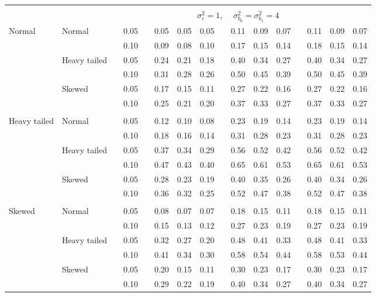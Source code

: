 \documentclass{article} %
\begin{document}
\begin{table}[ht]
\begin{scriptsize}
\begin{center}
\begin{tabular}{ll p{.1cm} c p{.1cm} rrr p{.1cm} rrr p{.1cm} rrr}
&&&&&&&&&&&&&&&\\
& && && \multicolumn{9}{c}{$\sigma_{\varepsilon}^2 = 1$, \ \ $\sigma_{b_0}^2 = \sigma_{b_1}^2 = 4$} \\ \cline{6-16}
Normal       & Normal       && 0.05 &&  0.05 & 0.05 & 0.05 && 0.11 & 0.09 & 0.07 && 0.11 & 0.09 & 0.07 \\ 
             &              && 0.10 &&  0.09 & 0.08 & 0.10 && 0.17 & 0.15 & 0.14 && 0.18 & 0.15 & 0.14 \\ 
             & Heavy tailed && 0.05 &&  0.24 & 0.21 & 0.18 && 0.40 & 0.34 & 0.27 && 0.40 & 0.34 & 0.27 \\ 
             &              && 0.10 &&  0.31 & 0.28 & 0.26 && 0.50 & 0.45 & 0.39 && 0.50 & 0.45 & 0.39 \\ 
             & Skewed       && 0.05 &&  0.17 & 0.15 & 0.11 && 0.27 & 0.22 & 0.16 && 0.27 & 0.22 & 0.16 \\ 
             &              && 0.10 &&  0.25 & 0.21 & 0.20 && 0.37 & 0.33 & 0.27 && 0.37 & 0.33 & 0.27 \\ 
             &&&&&&&&&&&&&&&\\
Heavy tailed & Normal       && 0.05 &&  0.12 & 0.10 & 0.08 && 0.23 & 0.19 & 0.14 && 0.23 & 0.19 & 0.14 \\ 
             &              && 0.10 &&  0.18 & 0.16 & 0.14 && 0.31 & 0.28 & 0.23 && 0.31 & 0.28 & 0.23 \\ 
             & Heavy tailed && 0.05 &&  0.37 & 0.34 & 0.29 && 0.56 & 0.52 & 0.42 && 0.56 & 0.52 & 0.42 \\ 
             &              && 0.10 &&  0.47 & 0.43 & 0.40 && 0.65 & 0.61 & 0.53 && 0.65 & 0.61 & 0.53 \\ 
             & Skewed       && 0.05 &&  0.28 & 0.23 & 0.19 && 0.40 & 0.35 & 0.26 && 0.40 & 0.34 & 0.26 \\ 
             &              && 0.10 &&  0.36 & 0.32 & 0.25 && 0.52 & 0.47 & 0.38 && 0.52 & 0.47 & 0.38 \\ 
             &&&&&&&&&&&&&&&\\
Skewed       & Normal       && 0.05 &&  0.08 & 0.07 & 0.07 && 0.18 & 0.15 & 0.11 && 0.18 & 0.15 & 0.11 \\ 
             &              && 0.10 &&  0.15 & 0.13 & 0.12 && 0.27 & 0.23 & 0.19 && 0.27 & 0.23 & 0.19 \\ 
             & Heavy tailed && 0.05 &&  0.32 & 0.27 & 0.20 && 0.48 & 0.41 & 0.33 && 0.48 & 0.41 & 0.33 \\ 
             &              && 0.10 &&  0.41 & 0.34 & 0.30 && 0.58 & 0.54 & 0.44 && 0.58 & 0.53 & 0.44 \\ 
             & Skewed       && 0.05 &&  0.20 & 0.15 & 0.11 && 0.30 & 0.23 & 0.17 && 0.30 & 0.23 & 0.17 \\ 
             &              && 0.10 &&  0.29 & 0.22 & 0.19 && 0.40 & 0.34 & 0.27 && 0.40 & 0.34 & 0.27 \\ 



\end{tabular}
\end{center}
\end{scriptsize}
\end{table}
\end{document}

